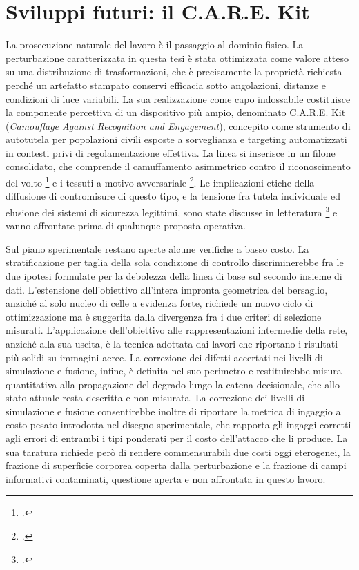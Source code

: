 \documentclass[a4paper,12pt]{report}
\begin{document}
\section{Sviluppi futuri: il C.A.R.E. Kit}

La prosecuzione naturale del lavoro è il passaggio al dominio fisico. La perturbazione caratterizzata in questa tesi è stata ottimizzata come valore atteso su una distribuzione di trasformazioni, che è precisamente la proprietà richiesta perché un artefatto stampato conservi efficacia sotto angolazioni, distanze e condizioni di luce variabili. La sua realizzazione come capo indossabile costituisce la componente percettiva di un dispositivo più ampio, denominato C.A.R.E. Kit (\textit{Camouflage Against Recognition and Engagement}), concepito come strumento di autotutela per popolazioni civili esposte a sorveglianza e targeting automatizzati in contesti privi di regolamentazione effettiva. La linea si inserisce in un filone consolidato, che comprende il camuffamento asimmetrico contro il riconoscimento del volto \footcite{harvey_2010} e i tessuti a motivo avversariale \footcite{wu_2020, hu_2022}. Le implicazioni etiche della diffusione di contromisure di questo tipo, e la tensione fra tutela individuale ed elusione dei sistemi di sicurezza legittimi, sono state discusse in letteratura \footcite{helkala_2023} e vanno affrontate prima di qualunque proposta operativa.

Sul piano sperimentale restano aperte alcune verifiche a basso costo. La stratificazione per taglia della sola condizione di controllo discriminerebbe fra le due ipotesi formulate per la debolezza della linea di base sul secondo insieme di dati. L'estensione dell'obiettivo all'intera impronta geometrica del bersaglio, anziché al solo nucleo di celle a evidenza forte, richiede un nuovo ciclo di ottimizzazione ma è suggerita dalla divergenza fra i due criteri di selezione misurati. L'applicazione dell'obiettivo alle rappresentazioni intermedie della rete, anziché alla sua uscita, è la tecnica adottata dai lavori che riportano i risultati più solidi su immagini aeree. La correzione dei difetti accertati nei livelli di simulazione e fusione, infine, è definita nel suo perimetro e restituirebbe misura quantitativa alla propagazione del degrado lungo la catena decisionale, che allo stato attuale resta descritta e non misurata.
La correzione dei livelli di simulazione e fusione consentirebbe inoltre di
riportare la metrica di ingaggio a costo pesato introdotta nel disegno
sperimentale, che rapporta gli ingaggi corretti agli errori di entrambi i tipi
ponderati per il costo dell'attacco che li produce. La sua taratura richiede
però di rendere commensurabili due costi oggi eterogenei, la frazione di
superficie corporea coperta dalla perturbazione e la frazione di campi
informativi contaminati, questione aperta e non affrontata in questo lavoro.


\printbibliography[heading=bibintoc,title={Bibliografia}]
\end{document}
